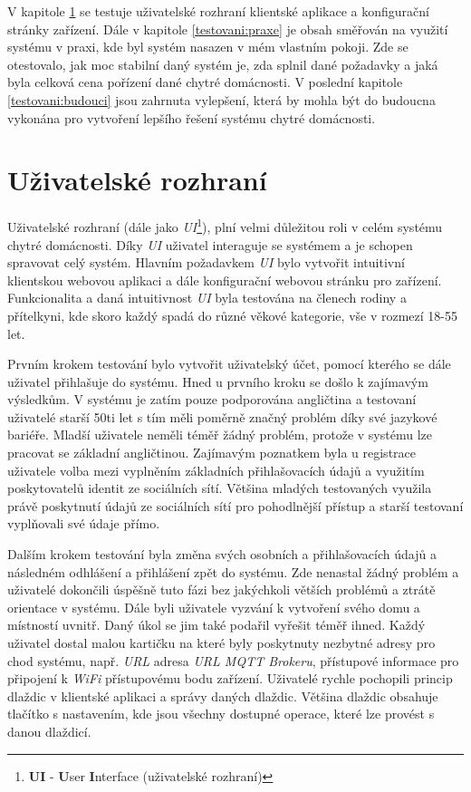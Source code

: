 V kapitole \ref{testovani:UI} se testuje uživatelské rozhraní klientské aplikace a konfigurační stránky zařízení.
Dále v kapitole \ref{testovani:praxe} je obsah směřován na využití systému v praxi, kde byl systém nasazen v mém vlastním pokoji.
Zde se otestovalo, jak moc stabilní daný systém je, zda splnil dané požadavky a jaká byla celková cena pořízení dané chytré domácnosti.
V poslední kapitole \ref{testovani:budouci} jsou zahrnuta vylepšení, která by mohla být do budoucna vykonána pro vytvoření lepšího řešení systému chytré domácnosti.

\section{Uživatelské rozhraní}
\label{testovani:UI}
Uživatelské rozhraní (dále jako \emph{UI}\footnote{\textbf{UI} - \textbf{U}ser \textbf{I}nterface (uživatelské rozhraní)}), plní velmi důležitou roli v celém systému chytré domácnosti.
Díky \emph{UI} uživatel interaguje se systémem a je schopen spravovat celý systém.
Hlavním požadavkem \emph{UI} bylo vytvořit intuitivní klientskou webovou aplikaci a dále konfigurační webovou stránku pro zařízení.
Funkcionalita a daná intuitivnost \emph{UI} byla testována na členech rodiny a přítelkyni, kde skoro každý spadá do různé věkové kategorie, vše v rozmezí 18-55 let.

Prvním krokem testování bylo vytvořit uživatelský účet, pomocí kterého se dále uživatel přihlašuje do systému.
Hned u prvního kroku se došlo k zajímavým výsledkům.
V systému je zatím pouze podporována angličtina a testovaní uživatelé starší 50ti let s tím měli poměrně značný problém díky své jazykové bariéře.
Mladší uživatele neměli téměř žádný problém, protože v systému lze pracovat se základní angličtinou.
Zajímavým poznatkem byla u registrace uživatele volba mezi vyplněním základních přihlašovacích údajů a využitím poskytovatelů identit ze sociálních sítí.
Většina mladých testovaných využila právě poskytnutí údajů ze sociálních sítí pro pohodlnější přístup a starší testovaní vyplňovali své údaje přímo.

Dalším krokem testování byla změna svých osobních a přihlašovacích údajů a následném odhlášení a přihlášení zpět do systému.
Zde nenastal žádný problém a uživatelé dokončili úspěšně tuto fázi bez jakýchkoli větších problémů a ztrátě orientace v systému.
\newpage
Dále byli uživatele vyzvání k vytvoření svého domu a místností uvnitř.
Daný úkol se jim také podařil vyřešit téměř ihned.
Každý uživatel dostal malou kartičku na které byly poskytnuty nezbytné adresy pro chod systému, např. \emph{URL} adresa \emph{URL MQTT Brokeru}, přístupové informace pro připojení k \emph{WiFi} přístupovému bodu zařízení.
Uživatelé rychle pochopili princip dlaždic v klientské aplikaci a správy daných dlaždic.
Většina dlaždic obsahuje tlačítko s nastavením, kde jsou všechny dostupné operace, které lze provést s danou dlaždicí.

